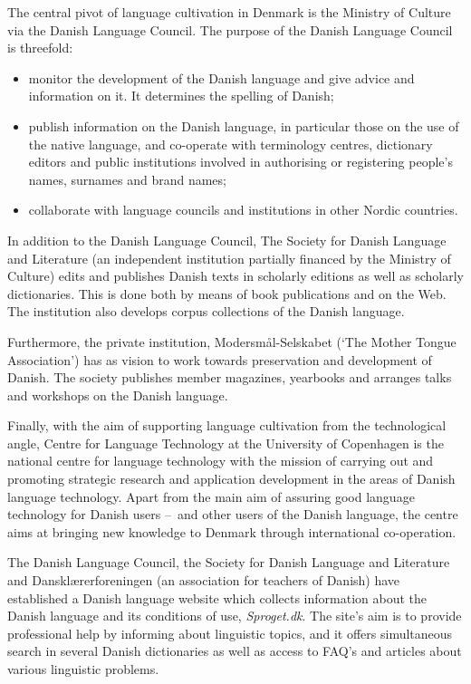 \begin{multicols}{2}
The central pivot of language cultivation in Denmark is the Ministry of Culture via the Danish Language Council. The purpose of the Danish Language Council is threefold: 
\begin{itemize}
\item	monitor the development of the Danish language and give advice and information on it. It determines the spelling of Danish;
\item	publish information on the Danish language, in particular those on the use of the native language, and co-operate with terminology centres, dictionary editors and public institutions involved in authorising or registering people's names,  surnames and brand names;
\item	collaborate with language councils and institutions in other Nordic countries.	
\end{itemize}
In addition to the Danish Language Council, The Society for Danish Language and Literature (an independent institution partially financed by the Ministry of Culture) edits and publishes Danish texts in scholarly editions as well as scholarly dictionaries. This is done both by means of book publications and on the Web. The institution also develops corpus collections of the Danish language.


Furthermore, the private institution, Moders\-m\aa l-Selskabet (`The Mother Tongue Association') has as vision to work towards preservation and development of Danish. The society publishes member magazines,  yearbooks and arranges talks and workshops on the Danish language.


Finally, with the aim of supporting language cultivation from the technological angle, Centre for Language Technology at the University of Copenhagen is the national centre for language technology with the mission of carrying out and promoting strategic research and application development in the areas of Danish language technology. Apart from the main aim of assuring good language technology for Danish users --~and other users of the Danish language, the centre aims at bringing new knowledge to Denmark through international co-operation.

The Danish Language Council, the Society for Danish Language and Literature and Dansk\-l\ae rerforeningen (an association for teachers of Danish) have established a Danish language website which collects information about the Danish language and its conditions of use, {\it Sproget.dk}. The site's aim is to provide professional help by informing about linguistic topics, and it offers simultaneous search in several Danish dictionaries as well as access to FAQ's and articles about various linguistic problems. 


\end{multicols}
